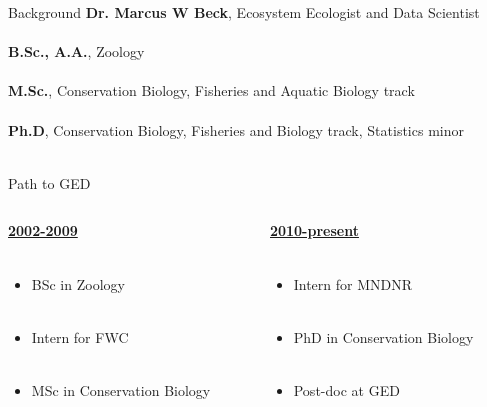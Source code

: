 \documentclass[serif]{beamer}\usepackage[]{graphicx}\usepackage[]{color}
\begin{document}
\begin{frame}{Background}{}
{\bf Dr. Marcus W Beck}, Ecosystem Ecologist and Data Scientist \\~\\
{\bf B.Sc., A.A.}, Zoology \\~\\
{\bf M.Sc.}, Conservation Biology, Fisheries and Aquatic Biology track \\~\\
{\bf Ph.D},  Conservation Biology, Fisheries and Biology track, Statistics minor \\~\\
\end{frame}

\begin{frame}{Path to GED}
\begin{columns}[t]
\begin{column}{0.35\textwidth}
\underline{\textbf{2002-2009}}\\~\\
\begin{itemize}
\item BSc in Zoology \\~\\
\item Intern for FWC \\~\\
\item MSc in Conservation Biology \\~\\
\end{itemize}
\end{column}
\begin{column}{0.35\textwidth}
\underline{\textbf{2010-present}}\\~\\
\begin{itemize}
\item Intern for MNDNR \\~\\
\item PhD in Conservation Biology \\~\\
\item Post-doc at GED \\~\\
\end{itemize}
\end{column}
\end{columns}
\end{frame}
\end{document}
